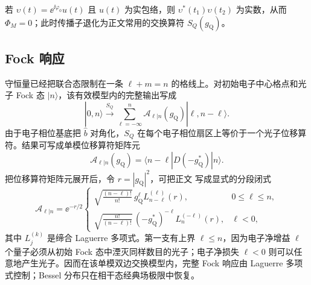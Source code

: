 若 $\upsilon(t)=\ee^{\ii\varphi_0}u(t)$ 且 $u(t)$ 为实包络，则 $\upsilon^*(t_1)\upsilon(t_2)$ 为实数，从而 $\Phi_M=0$；此时传播子退化为正文常用的交换算符 $S_Q(g_{\mathrm Q})$。

\subsection{Fock 响应}

守恒量已经把联合态限制在一条 $\ell+m=n$ 的格线上。对初始电子中心格点和光子 Fock 态 $|n\rangle$，该有效模型内的完整输出写成
\begin{equation}
{
|0,n\rangle\xrightarrow{S_Q}
\sum_{\ell=-\infty}^{n}
\mathcal A_{\ell|n}(g_{\mathrm Q})|\ell,n-\ell\rangle.}
\label{eq:qpinem_joint_fock}
\end{equation}
由于电子相位基底把 $\hat b$ 对角化，$S_Q$ 在每个电子相位扇区上等价于一个光子位移算符。结果可写成单模位移算符矩阵元
\begin{equation}
{
\mathcal A_{\ell|n}(g_{\mathrm Q})
=\langle n-\ell|D(-g_{\mathrm Q}^*)|n\rangle.}
\label{eq:A_l_n_displacement}
\end{equation}
把位移算符矩阵元展开后，令 $r=|g_{\mathrm Q}|^2$，可把正文 写成显式的分段闭式
\begin{equation}
{
\mathcal A_{\ell|n}=\ee^{-r/2}
\begin{cases}
\displaystyle
\sqrt{\frac{(n-\ell)!}{n!}}\,g_{\mathrm Q}^{\ell}
L_{n-\ell}^{(\ell)}(r), & 0\le\ell\le n,\\[8pt]
\displaystyle
\sqrt{\frac{n!}{(n-\ell)!}}\,(-g_{\mathrm Q}^*)^{-\ell}
L_n^{(-\ell)}(r), & \ell<0,
\end{cases}}
\label{eq:qpinem-fock-laguerre-dp68}
\end{equation}
其中 $L_j^{(k)}$ 是缔合 Laguerre 多项式。第一支有上界 $\ell\le n$，因为电子净增益 $\ell$ 个量子必须从初始 Fock 态中湮灭同样数目的光子；电子净损失 $\ell<0$ 则可以任意地产生光子。因而在该单模双边交换模型内，完整 Fock 响应由 Laguerre 多项式控制；Bessel 分布只在相干态经典场极限中恢复。

